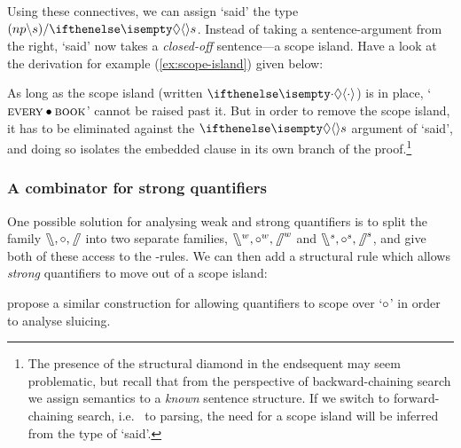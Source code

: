 \documentclass[10pt,a4paper]{llncs}
\begin{document}
\noindent
Using these connectives, we can assign `said' the type
$({np}\impr{s})\impl\di{s}$. Instead of taking a sentence-argument
from the right, `said' now takes a \emph{closed-off} sentence---a
scope island. Have a look at the derivation for example
(\ref{ex:scope-island}) given below:
\begin{scprooftree}
\end{scprooftree}
As long as the scope island (written $\di[\cdot]$) is in place,
`$\textsc{every}\prod\textsc{book}$' cannot be raised past it. But in
order to remove the scope island, it has to be eliminated against the
$\di{s}$ argument of `said', and doing so isolates the embedded clause
in its own branch of the proof.\footnote{%
  The presence of the structural diamond in the endsequent
  may seem problematic, but recall that from the perspective of
  backward-chaining search we assign semantics to a \emph{known}
  sentence structure. If we switch to forward-chaining search, i.e.\ %
  to parsing, the need for a scope island will be inferred from the
  type of `said'.
}

\subsubsection*{A combinator for strong quantifiers}
One possible solution for analysing weak and strong quantifiers is to
split the family $\himpr,\hprod,\himpl$ into two separate families,
$\himpr^w,\hprod^w,\himpl^w$ and $\himpr^s,\hprod^s,\himpl^s$, and
give both of these access to the \I\B\C-rules. We can then add a
structural rule which allows \emph{strong} quantifiers to move out of
a scope island:
\vspace*{-1\baselineskip}
\begin{center}
  \begin{scprooftree*}
    \doubleLine\RightLabel{$\I^*$}
  \end{scprooftree*}
\end{center}
\citet[][ch.\ 17.11]{barker2015} propose a similar construction for
allowing quantifiers to scope over `$\hprod$' in order to analyse
sluicing.
\end{document}
